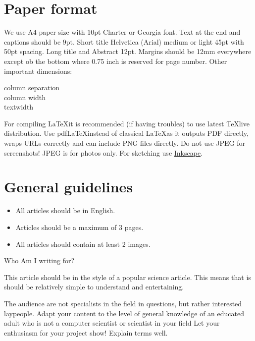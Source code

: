\documentclass[a4paper, twoside]{article}
\newcommand{\highlight}[1]{\textcolor{prace-orange}{#1}}
\begin{document}
\begin{multicols}{3}
\section*{Paper format}
We use A4 paper size with 10pt Charter or Georgia font. Text at the end and captions should be 9pt. Short title Helvetica (Arial) medium or light 45pt with 50pt spacing. Long title and Abstract 12pt. Margins should be 12mm everywhere except ob the bottom where 0.75 inch is reserved for page number. Other important dimensions: 
\begin{description}
  \item[column separation]  \the\columnsep
  \item[column width] \the\columnwidth
  \item[textwidth] \the\textwidth
\end{description}
For compiling \LaTeX it is recommended (if having troubles) to use latest \TeX live distribution. Use pdf\LaTeX instead of classical \LaTeX as it outputs PDF directly, wraps URLs correctly and can include PNG files directly. Do not use JPEG for screenshots! JPEG is for photos only. For sketching use \href{http://www.inkscape.org}{Inkscape}. 

\section*{General guidelines}
\newcommand{\itempar}[1]{\noindent\highlight{\textsf #1}\par\noindent}
\begin{itemize}
  \setlength{\itemsep}{0pt plus 3pt}\setlength{\topsep}{0pt plus 4pt}
  \setlength{\partopsep}{0pt}\setlength{\parsep}{0pt}\setlength{\parskip}{0pt}
\item All articles should be in English.
\item Articles should be a maximum of 3 pages.
\item All articles should contain at least 2 images.
\end{itemize}

\itempar{Who Am I writing for?}This article should be in the style of a popular science article. This means that is should be relatively simple to understand and entertaining. 


\noindent The audience are not specialists in the field in questions, but rather interested laypeople. Adapt your content to the level of general knowledge of an educated adult who is not a computer scientist or scientist in your field Let your enthusiasm for your project show! Explain terms well. 


\end{multicols}
\end{document}
